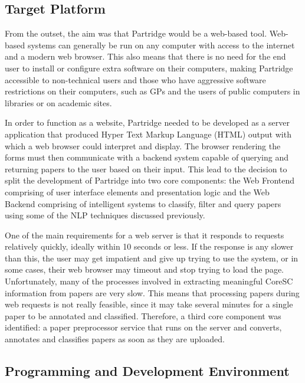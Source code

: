 \subsection{Target Platform}

From the outset, the aim was that Partridge would be a web-based tool.
Web-based systems can generally be run on any computer with access to the
internet and a modern web browser. This also means that there is no need for
the end user to install or configure extra software on their computers, making
Partridge accessible to non-technical users and those who have aggressive
software restrictions on their computers, such as GPs and the users of public
computers in libraries or on academic sites.

In order to function as a website, Partridge needed to be developed as a server
application that produced Hyper Text Markup Language (HTML) output with which a web
browser could interpret and display. The browser rendering the forms must then
communicate with a backend system capable of querying and returning papers to
the user based on their input. This lead to the decision to split the development
of Partridge into two core components: the Web Frontend comprising of user
interface elements and presentation logic and the Web Backend comprising of
intelligent systems to classify, filter and query papers using some of the NLP
techniques discussed previously.

One of the main requirements for a web server is that it responds to requests
relatively quickly, ideally within 10 seconds or less. If the response is any
slower than this, the user may get impatient and give up trying to use the
system, or in some cases, their web browser may timeout and stop trying to load
the page. Unfortunately, many of the processes involved in extracting meaningful CoreSC
information from papers are very slow. This means that processing papers
during web requests is not really feasible, since it may take several minutes
for a single paper to be annotated and classified. Therefore, a third core
component was identified: a paper preprocessor service that runs on the server
and converts, annotates and classifies papers as soon as they are uploaded.

\subsection{ Programming and Development Environment }

